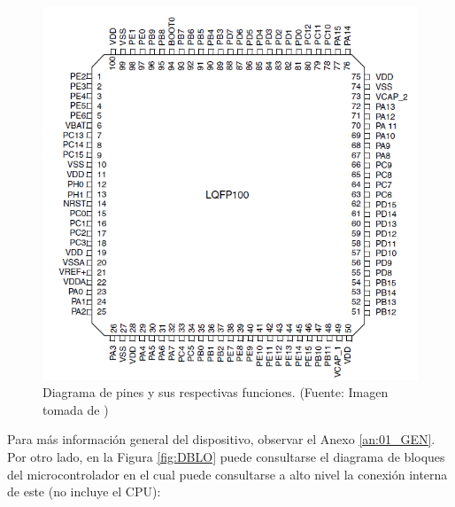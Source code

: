 \begin{figure}[H]
\centering
\includegraphics[scale=0.5]{./Figuras/Nota_teorica/PINES}
\caption{Diagrama de pines y sus respectivas funciones. (Fuente: Imagen tomada de \cite{ST})}
\label{fig:ST_pins}
\end{figure}

Para más información general del dispositivo, observar el Anexo \ref{an:01_GEN}. Por otro lado, en la Figura \ref{fig:DBLO} puede consultarse el diagrama de bloques del microcontrolador en el cual puede consultarse a alto nivel la conexión interna de este (no incluye el CPU):

